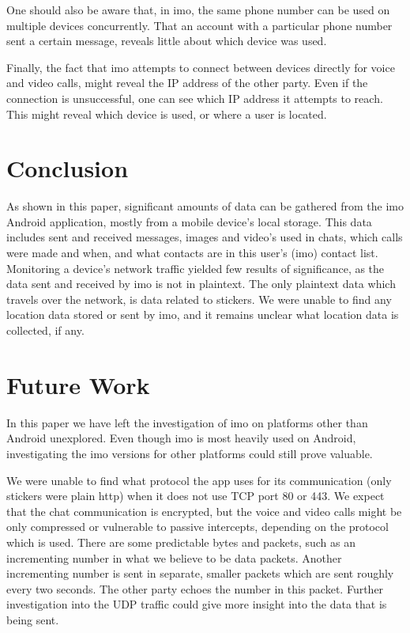 \documentclass[conference]{IEEEtran}
\begin{document}
One should also be aware that, in imo, the same phone number can be used on
multiple devices concurrently. That an account with a particular phone number
sent a certain message, reveals little about which device was used.

Finally, the fact that imo attempts to connect between devices directly for
voice and video calls, might reveal the IP address of the other party. Even if
the connection is unsuccessful, one can see which IP address it attempts to
reach. This might reveal which device is used, or where a user is located.


\section{Conclusion}\label{sec:conc}

As shown in this paper, significant amounts of data can be gathered from the
imo Android application, mostly from a mobile device's local storage. This data
includes sent and received messages, images and video's used in chats, which
calls were made and when, and what contacts are in this user's (imo) contact
list. Monitoring a device's network traffic yielded few results of
significance, as the data sent and received by imo is not in plaintext. The
only plaintext data which travels over the network, is data related to
stickers. We were unable to find any location data stored or sent by imo, and
it remains unclear what location data is collected, if any.


\section{Future Work}\label{sec:futwork}

In this paper we have left the investigation of imo on platforms other than
Android unexplored. Even though imo is most heavily used on Android,
investigating the imo versions for other platforms could still prove valuable.

We were unable to find what protocol the app uses for its communication (only
stickers were plain http) when it does not use TCP port 80 or 443. We expect
that the chat communication is encrypted, but the voice and video calls might
be only compressed or vulnerable to passive intercepts, depending on the
protocol which is used. There are some predictable bytes and packets, such as
an incrementing number in what we believe to be data packets. Another
incrementing number is sent in separate, smaller packets which are sent roughly
every two seconds. The other party echoes the number in this packet. Further
investigation into the UDP traffic could give more insight into the data that
is being sent.
\end{document}
